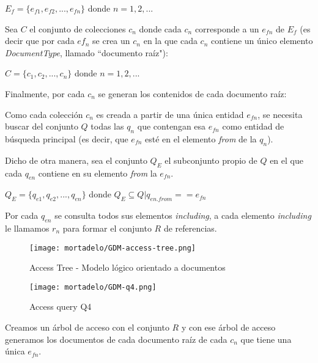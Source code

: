 \begin{center}
    $ E_{f} = \{e_{f1},e_{f2},...,e_{fn}\} $ donde $n=1,2,...$    
\end{center}


Sea $C$ el conjunto de colecciones $c_{n}$ donde cada $c_{n}$ corresponde a un $e_{fn}$ de $E_{f}$ (es decir que por cada $ef_{n}$ se crea un $c_{n}$ en la que cada $c_{n}$ contiene un único elemento \textit{DocumentType}, llamado ``documento raíz"):

\begin{center}
    $C = \{ c_{1},c_{2},...,c_{n}\}$ donde $n=1,2,...$    
\end{center}

Finalmente, por cada $c_{n}$ se generan los contenidos de cada documento raíz:

Como cada colección $c_{n}$ es creada a partir de una única entidad $e_{fn}$, se necesita buscar del conjunto $Q$ todas las $q_{n}$ que contengan esa $e_{fn}$ como entidad de búsqueda principal (es decir, que $e_{fn}$ esté en el elemento \textit{from} de la $q_{n}$).


Dicho de otra manera, sea el conjunto $Q_{E}$ el subconjunto propio de $Q$ en el que cada $q_{en}$ contiene en su elemento \textit{from} la $e_{fn}$.
\begin{center}
    $Q_{E} = \{q_{e1},q_{e2},...,q_{en}\}$ donde $Q_{E} \subseteq Q  | q_{en.from} == e_{fn}$
\end{center}

Por cada $q_{en}$ se consulta todos sus elementos \textit{including}, a cada elemento \textit{including} le llamamos $r_{n}$ para formar el conjunto $R$ de referencias.

\begin{figure}[h!t] 
    \centering
    \texttt{[image: mortadelo/GDM-access-tree.png]}
    \caption{Access Tree - Modelo lógico orientado a documentos}
    \label{img:mortadelo-gdm-logical-model-access-tree}
\end{figure}

\begin{figure}[h!t] 
    \centering
    \texttt{[image: mortadelo/GDM-q4.png]}
    \caption{Access query Q4}
    \label{img:mortadelo-gdm-logical-model-q4}
\end{figure}

Creamos un árbol de acceso con el conjunto $R$ y con ese árbol de acceso generamos los documentos de cada documento raíz de cada $c_{n}$ que tiene una única $e_{fn}$. 


